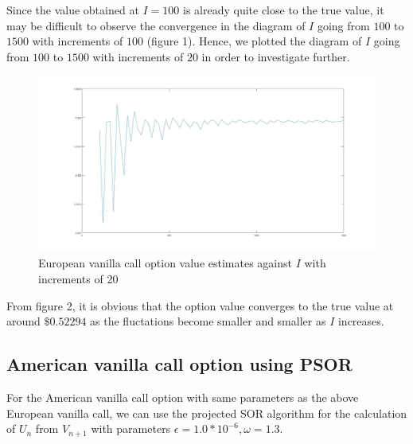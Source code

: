 Since the value obtained at $I = 100$ is already quite close to the true value, it may be difficult to observe the convergence in the diagram of $I$ going from $100$ to $1500$ with increments of $100$ (figure 1). Hence, we plotted the diagram of $I$ going from $100$ to $1500$ with increments of $20$ in order to investigate further.

\begin{figure}[htbp!]
	\centering
	\includegraphics[scale=0.2]{largePlot.jpg}
	\caption{European vanilla call option value estimates against $I$ with increments of 20}
\end{figure}

From figure 2, it is obvious that the option value converges to the true value at around $\$0.52294$ as the fluctations become smaller and smaller as $I$ increases.

\subsection{American vanilla call option using PSOR}

For the American vanilla call option with same parameters as the above European vanilla call, we can use the projected SOR algorithm for the calculation of $U_{n}$ from $V_{n+1}$ with parameters $\epsilon = 1.0 * 10^{-6}, \omega = 1.3$.

